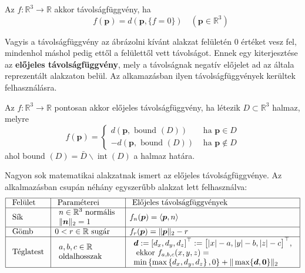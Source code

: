 \begin{definition}
Az  $f: \mathbb{R}^{3} \rightarrow \mathbb{R}$  akkor távolságfüggvény, ha \\
$$\qquad f(\boldsymbol{p})=d\left(\boldsymbol{p},  \{f = 0\}\right) \quad\left(\boldsymbol{p} \in \mathbb{R}^{3}\right)$$
\end{definition}

Vagyis a távolságfüggvény az ábrázolni kívánt alakzat felületén 0 értéket vesz fel, mindenhol máshol pedig ettől a felülettől vett távolságot. Ennek egy kiterjesztése az \textbf{előjeles távolságfüggvény}, mely a távolságnak negatív előjelet ad az általa reprezentált alakzaton belül. Az alkamazásban ilyen távolságfüggvények kerültek felhasználásra. 

\begin{definition}
Az $f: \mathbb{R}^{3} \rightarrow \mathbb{R}$ pontosan akkor előjeles távolságfüggvény, ha létezik $D \subset \mathbb{R}^{3}$ halmaz, melyre
\[
f(\boldsymbol{p})=\left\{\begin{array}{ll}
d(\boldsymbol{p}, \text { bound }(D)) & \text { ha } \boldsymbol{p} \in D \\
-d(\boldsymbol{p}, \text { bound }(D)) & \text { ha } \boldsymbol{p} \notin D
\end{array}\right.
\]
ahol bound $(D)=\bar{D} \backslash \operatorname{int}(D)$ a halmaz határa.
\end{definition}

\cleardoublepage
Nagyon sok matematikai alakzatnak ismert az előjeles távolságfüggvénye. Az alkalmazásban csupán néhány egyszerűbb alakzat lett felhasználva:
$$\begin{array}{|l|l|l|}
\hline \text { Felület } & \text { Paraméterei } & \text { Előjeles távolságfüggvények } \\
\hline \text { Sík } & \begin{array}{l}
n \in \mathbb{R}^{3} \text { normális } \\
\|\boldsymbol{n}\|_{2}=1
\end{array} & f_{n}(\boldsymbol{p})=\langle\boldsymbol{p}, n\rangle \\
\hline \text { Gömb } & 0<r \in \mathbb{R} \text { sugár } & f_{r}(\boldsymbol{p})=\|\boldsymbol{p}\|_{2}-r \\
\hline \text { Téglatest } & \begin{array}{l}
a, b, c \in \mathbb{R} \\
\text {oldalhosszak}
\end{array} & \begin{array}{l}
\boldsymbol{d}:=\left[d_{x}, d_{y}, d_{z}\right]^{\top}:=\big[|x|-a,|y|-b,|z|-c\big]^{\top},\\
\text { ekkor } f_{a, b, c}(x, y, z)=\\
\min \left\{\max \left\{d_{x}, d_{y}, d_{z}\right\}, 0\right\}+\|\max \{\boldsymbol{d}, \boldsymbol{0}\}\|_{2}
\end{array} \\
\hline
\end{array}$$


